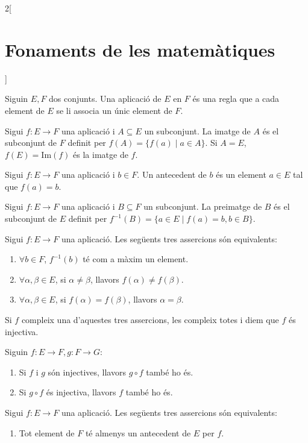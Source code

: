 \documentclass[../../../main.tex]{subfiles}
\begin{document}
\begin{multicols}{2}[\section{Fonaments de les matemàtiques}]
\begin{definition}
\end{definition}
\begin{definition}
Siguin $E,F$ dos conjunts. Una aplicació de $E$ en $F$ és una regla que a cada element de $E$ se li associa un únic element de $F$.
\end{definition}
\begin{definition}
Sigui $f:E\rightarrow F$ una aplicació i $A\subseteq E$ un subconjunt. La imatge de $A$ és el subconjunt de $F$ definit per $f(A)=\{f(a)\mid a\in A\}$. Si $A=E$, $f(E)=\text{Im}(f)$ és la imatge de $f$.
\end{definition}
\begin{definition}
Sigui $f:E\rightarrow F$ una aplicació i $b\in F$. Un antecedent de $b$ és un element $a\in E$ tal que $f(a)=b$.
\end{definition}
\begin{definition}
Sigui $f:E\rightarrow F$ una aplicació i $B\subseteq F$ un subconjunt. La preimatge de $B$ és el subconjunt de $E$ definit per $f^{-1}(B)=\{a\in E\mid f(a)=b,b\in B\}$.
\end{definition}
\begin{definition}
Sigui $f:E\rightarrow F$ una aplicació. Les següents tres assercions són equivalents:
\begin{enumerate}
    \item $\forall b\in F$, $f^{-1}(b)$ té com a màxim un element.
    \item $\forall\alpha,\beta\in E$, si $\alpha\ne\beta$, llavors $f(\alpha)\ne f(\beta)$.
    \item $\forall\alpha,\beta\in E$, si $f(\alpha)= f(\beta)$, llavors $\alpha=\beta$.
\end{enumerate}
Si $f$ compleix una d'aquestes tres assercions, les compleix totes i diem que $f$ és injectiva.
\end{definition}
\begin{prop}
Siguin $f:E\rightarrow F,g:F\rightarrow G$:
\begin{enumerate}
    \item Si $f$ i $g$ són injectives, llavors $g\circ f$ també ho és.
    \item Si $g\circ f$ és injectiva, llavors $f$ també ho és.
\end{enumerate}
\end{prop}
\begin{definition}
Sigui $f:E\rightarrow F$ una aplicació. Les següents tres assercions són equivalents:
\begin{enumerate}
    \item Tot element de $F$ té almenys un antecedent de $E$ per $f$.

\end{enumerate}
\end{definition}
\end{multicols}
\end{document}
